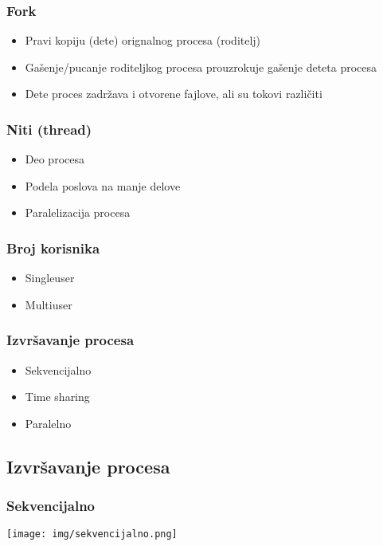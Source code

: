 \documentclass{beamer}
\begin{document}
\begin{frame}
    \frametitle{Fork}
    \begin{itemize}
        \item Pravi kopiju (dete) orignalnog procesa (roditelj) \newline
        \item Gašenje/pucanje roditeljkog procesa prouzrokuje gašenje deteta procesa \newline
        \item Dete proces zadržava i otvorene fajlove, ali su tokovi različiti
    \end{itemize}
\end{frame}

\begin{frame}
    \frametitle{Niti (thread)}
    \begin{itemize}
        \item Deo procesa \newline
        \item Podela poslova na manje delove \newline
        \item Paralelizacija procesa 
    \end{itemize}
\end{frame}

\begin{frame}
    \frametitle{Broj korisnika}
    \begin{itemize}
        \item Singleuser \newline
        \item Multiuser
    \end{itemize}
\end{frame}

\begin{frame}
    \frametitle{Izvršavanje procesa}
    \begin{itemize}
        \item Sekvencijalno \newline
        \item Time sharing \newline
        \item Paralelno
    \end{itemize}
\end{frame}

\subsection*{Izvršavanje procesa}
\begin{frame}
    \frametitle{Sekvencijalno}
    \begin{center}
        \texttt{[image: img/sekvencijalno.png]}
    \end{center}
\end{frame}
\end{document}
